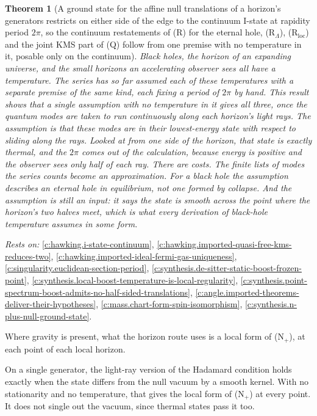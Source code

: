 \documentclass[11pt]{article}
\newtheorem{theorem}{Theorem}[section]
\theoremstyle{definition}
\theoremstyle{plain}
\begin{document}
\begin{theorem}[A ground state for the affine null translations of a horizon's generators restricts on either side of the edge to the continuum I-state at rapidity period $2\pi$, so the continuum restatements of (R) for the eternal hole, (R$_{\Lambda}$), (R$_{\mathrm{loc}}$) and the joint KMS part of (Q) follow from one premise with no temperature in it, posable only on the continuum]\label{c:synthesis.positive-null-energy-gives-r-premises}
Black holes, the horizon of an expanding universe, and the small horizons an accelerating observer sees all have a temperature. The series has so far assumed each of these temperatures with a separate premise of the same kind, each fixing a period of $2\pi$ by hand. This result shows that a single assumption with no temperature in it gives all three, once the quantum modes are taken to run continuously along each horizon's light rays. The assumption is that these modes are in their lowest-energy state with respect to sliding along the rays. Looked at from one side of the horizon, that state is exactly thermal, and the $2\pi$ comes out of the calculation, because energy is positive and the observer sees only half of each ray. There are costs. The finite lists of modes the series counts become an approximation. For a black hole the assumption describes an eternal hole in equilibrium, not one formed by collapse. And the assumption is still an input: it says the state is smooth across the point where the horizon's two halves meet, which is what every derivation of black-hole temperature assumes in some form.
\end{theorem}
\noindent\emph{Rests on:} \ref{c:hawking.i-state-continuum}, \ref{c:hawking.imported-quasi-free-kms-reduces-two}, \ref{c:hawking.imported-ideal-fermi-gas-uniqueness}, \ref{c:singularity.euclidean-section-period}, \ref{c:synthesis.de-sitter-static-boost-frozen-point}, \ref{c:synthesis.local-boost-temperature-is-local-regularity}, \ref{c:synthesis.point-spectrum-boost-admits-no-half-sided-translations}, \ref{c:angle.imported-theorems-deliver-their-hypotheses}, \ref{c:mass.chart-form-spin-isomorphism}, \ref{c:synthesis.n-plus-null-ground-state}.

Where gravity is present, what the horizon route uses is a local form of (N$_{+}$), at each point of each local horizon.

On a single generator, the light-ray version of the Hadamard condition holds exactly when the state differs from the null vacuum by a smooth kernel. With no stationarity and no temperature, that gives the local form of (N$_{+}$) at every point. It does not single out the vacuum, since thermal states pass it too.
\end{document}
